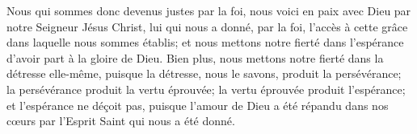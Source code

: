 Nous qui sommes donc devenus justes par la foi,
	nous voici en paix avec Dieu par notre Seigneur Jésus Christ,
	lui qui nous a donné, par la foi,
		l’accès à cette grâce dans laquelle nous sommes établis;
	et nous mettons notre fierté
		dans l’espérance d’avoir part à la gloire de Dieu.
Bien plus, nous mettons notre fierté dans la détresse elle-même,
	puisque la détresse, nous le savons, produit la persévérance;
	la persévérance produit la vertu éprouvée;
	la vertu éprouvée produit l’espérance;
	et l’espérance ne déçoit pas,
	puisque l’amour de Dieu a été répandu dans nos cœurs
		par l’Esprit Saint qui nous a été donné.
